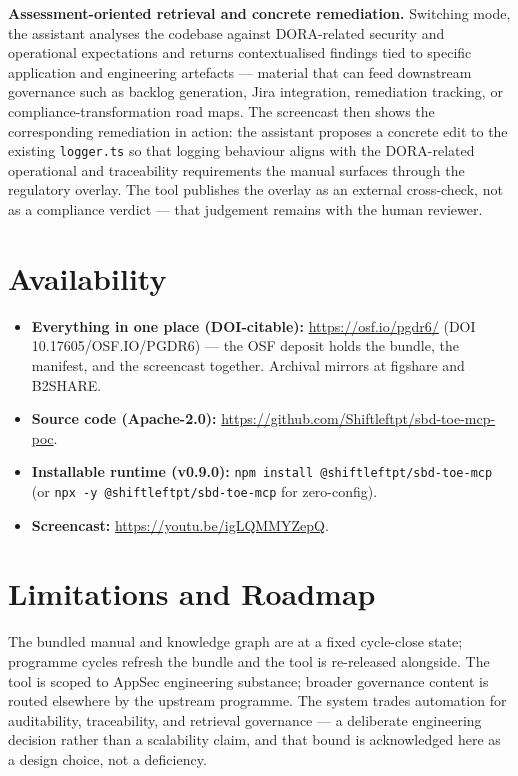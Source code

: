 \documentclass[conference]{IEEEtran}
\providecommand{\tightlist}{\setlength{\itemsep}{0pt}\setlength{\parskip}{0pt}}
\begin{document}
\textbf{Assessment-oriented retrieval and concrete remediation.}
Switching mode, the assistant analyses the codebase against DORA-related
security and operational expectations and returns contextualised
findings tied to specific application and engineering artefacts ---
material that can feed downstream governance such as backlog generation,
Jira integration, remediation tracking, or compliance-transformation
road maps. The screencast then shows the corresponding remediation in
action: the assistant proposes a concrete edit to the existing
\texttt{logger.ts} so that logging behaviour aligns with the
DORA-related operational and traceability requirements the manual
surfaces through the regulatory overlay. The tool publishes the overlay
as an external cross-check, not as a compliance verdict --- that
judgement remains with the human reviewer.

\section{Availability}\label{availability}

\begin{itemize}
\tightlist
\item
  \textbf{Everything in one place (DOI-citable):}
  \url{https://osf.io/pgdr6/} (DOI 10.17605/OSF.IO/PGDR6) --- the OSF
  deposit holds the bundle, the manifest, and the screencast together.
  Archival mirrors at figshare and B2SHARE.
\item
  \textbf{Source code (Apache-2.0):}
  \url{https://github.com/Shiftleftpt/sbd-toe-mcp-poc}.
\item
  \textbf{Installable runtime (v0.9.0):}
  \texttt{npm install @shiftleftpt/sbd-toe-mcp} (or
  \texttt{npx -y @shiftleftpt/sbd-toe-mcp} for zero-config).
\item
  \textbf{Screencast:} \url{https://youtu.be/igLQMMYZepQ}.
\end{itemize}

\section{Limitations and Roadmap}\label{limitations-and-roadmap}

The bundled manual and knowledge graph are at a fixed cycle-close state;
programme cycles refresh the bundle and the tool is re-released
alongside. The tool is scoped to AppSec engineering substance; broader
governance content is routed elsewhere by the upstream programme. The
system trades automation for auditability, traceability, and retrieval
governance --- a deliberate engineering decision rather than a
scalability claim, and that bound is acknowledged here as a design
choice, not a deficiency.
\end{document}
